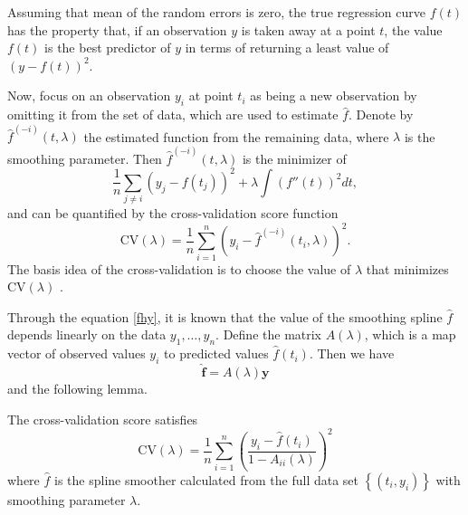 Assuming that mean of the random errors is zero, the true regression curve $f(t)$ has the property that, if an observation $y$ is taken away at a point $t$, the value $f(t)$ is the best predictor of $y$ in terms of returning a least value of $\left(y-f(t)\right)^2$. 

Now, focus on an observation $y_i$ at point $t_i$ as being a new observation by omitting it from the set of data, which are used to estimate $\hat{f}$. Denote by $\hat{f}^{(-i)}(t,\lambda)$ the estimated function from the remaining data, where $\lambda$ is the smoothing parameter. Then $\hat{f}^{(-i)}\left(t,\lambda\right)$ is the minimizer of  
\begin{equation}\label{originalcv}
\frac{1}{n}\sum_{j \neq i}\left(y_j-f(t_j) \right)^2+\lambda\int (f''(t))^2dt,
\end{equation}
and can be quantified by the cross-validation score function
\begin{equation}\label{cvform}
\mbox{CV}(\lambda)=\frac{1}{n}\sum_{i=1}^{n}\left(  y_i-\hat{f}^{(-i)}(t_i,\lambda)\right) ^2.
\end{equation}
The basis idea of the cross-validation is to choose the value of $\lambda$ that minimizes $\mbox{CV}(\lambda)$ \citep{green1993nonparametric}. 

Through the equation \eqref{fhy}, it is known that the value of the smoothing spline $\hat{f}$ depends linearly on the data $y_1,\ldots,y_n$. Define the matrix $A(\lambda)$, which is a map vector of observed values $y_i$ to predicted values $\hat{f}(t_i)$. Then we have
\begin{equation}\label{crossvalidationmatrixA}
 \mathbf{\hat{f}}=A(\lambda)\mathbf{y}
\end{equation}
and the following lemma.
\begin{lemma}\citep{green1993nonparametric}\label{cvlema}
The cross-validation score satisfies
\begin{equation}
\mbox{CV}(\lambda)=\frac{1}{n} \sum_{i=1}^n \left(\frac{y_i-\hat{f}(t_i)}{1-A_{ii}(\lambda)}\right)^2
\end{equation}
where $\hat{f}$ is the spline smoother calculated from the full data set $\left\lbrace (t_i,y_i)\right\rbrace$ with smoothing parameter $\lambda$.
\end{lemma}

